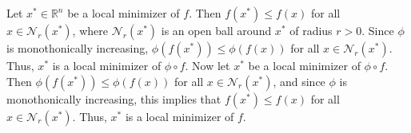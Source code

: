 \documentclass[12pt]{article}
\newenvironment{problem}[2][Problem]{\begin{trivlist}
\item[\hskip \labelsep {\bfseries #1}\hskip \labelsep {\bfseries #2.}]}{\end{trivlist}}
\begin{document}
\begin{problem}{7.21}
Let $x^*\in\mathbb R^n$ be a local minimizer of $f$.
Then $f(x^*)\leq f(x)$ for all $x\in\mathcal N_r(x^*)$,
where $\mathcal N_r(x^*)$ is an open ball around $x^*$ of radius $r>0$.
Since $\phi$ is monothonically increasing, $\phi(f(x^*))\leq\phi(f(x))$ for all $x\in\mathcal N_r(x^*)$.
Thus, $x^*$ is a local minimizer of $\phi\circ f$.
Now let $x^*$ be a local minimizer of $\phi\circ f$.
Then $\phi(f(x^*))\leq\phi(f(x))$ for all $x\in\mathcal N_r(x^*)$,
and since $\phi$ is monothonically increasing, this implies that
$f(x^*)\leq f(x)$ for all $x\in\mathcal N_r(x^*)$.
Thus, $x^*$ is a local minimizer of $f$.
\end{problem}
\end{document}
